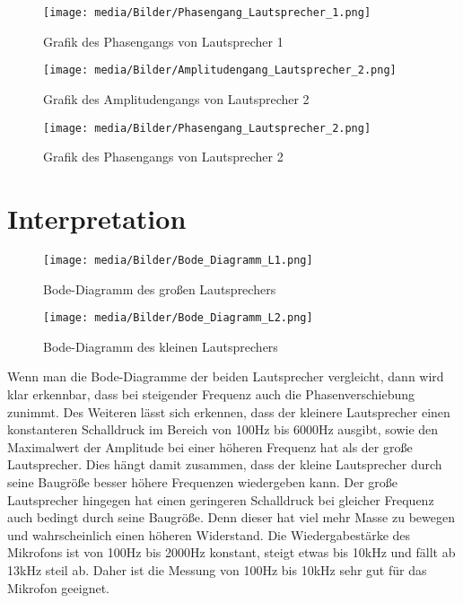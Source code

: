 \documentclass[12pt, oneside, a4paper, \docLanguage]{report}
\begin{document}
\begin{figure}[H]
	\centering
	\texttt{[image: media/Bilder/Phasengang\_Lautsprecher\_1.png]}
	\caption[Phasengang1]{Grafik des Phasengangs von Lautsprecher 1}
	\label{fig:Phasengang1}
\end{figure}

\begin{figure}[H]
	\centering
	\texttt{[image: media/Bilder/Amplitudengang\_Lautsprecher\_2.png]}
	\caption[Amplitudengang2]{Grafik des Amplitudengangs von Lautsprecher 2}
	\label{fig:Amplitudengang2}
\end{figure}

\begin{figure}[H]
	\centering
	\texttt{[image: media/Bilder/Phasengang\_Lautsprecher\_2.png]}
	\caption[Phasengang2]{Grafik des Phasengangs von Lautsprecher 2}
	\label{fig:Phasengang2}
\end{figure}

\newpage

\section{Interpretation}
\label{chap:VERSUCH_2_INTERPRETATION}

\begin{figure}[H]
	\centering
	\texttt{[image: media/Bilder/Bode\_Diagramm\_L1.png]}
	\caption[BodeDiagrammL1]{Bode-Diagramm des großen Lautsprechers}
	\label{fig:BodeDiagrammL1}
\end{figure}

\begin{figure}[H]
	\centering
	\texttt{[image: media/Bilder/Bode\_Diagramm\_L2.png]}
	\caption[BodeDiagrammL2]{Bode-Diagramm des kleinen Lautsprechers}
	\label{fig:BodeDiagrammL2}
\end{figure}

\newpage

Wenn man die Bode-Diagramme der beiden Lautsprecher vergleicht, dann wird klar erkennbar, dass bei steigender Frequenz auch die Phasenverschiebung zunimmt.
Des Weiteren lässt sich erkennen, dass der kleinere Lautsprecher einen konstanteren Schalldruck im Bereich von 100Hz bis 6000Hz ausgibt, sowie den Maximalwert der Amplitude bei einer höheren Frequenz hat als der große Lautsprecher. Dies hängt damit zusammen, dass der kleine Lautsprecher durch seine Baugröße besser höhere Frequenzen wiedergeben kann. Der große Lautsprecher hingegen hat einen geringeren Schalldruck bei gleicher Frequenz auch bedingt durch seine Baugröße. Denn dieser hat viel mehr Masse zu bewegen und wahrscheinlich einen höheren Widerstand. Die Wiedergabestärke des Mikrofons ist von 100Hz bis 2000Hz konstant, steigt etwas bis 10kHz und fällt ab 13kHz steil ab. Daher ist die Messung von 100Hz bis 10kHz sehr gut für das Mikrofon geeignet. 
\end{document}
